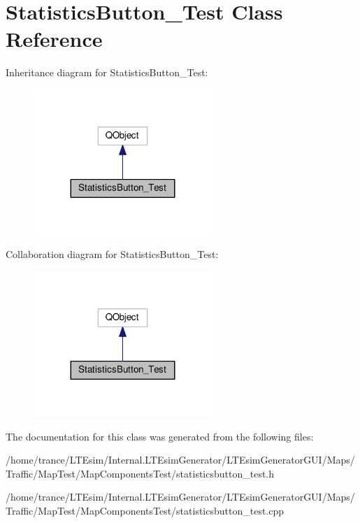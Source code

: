 \hypertarget{class_statistics_button___test}{}\section{Statistics\+Button\+\_\+\+Test Class Reference}
\label{class_statistics_button___test}


Inheritance diagram for Statistics\+Button\+\_\+\+Test\+:
\nopagebreak
\begin{figure}[H]
\begin{center}
\leavevmode
\includegraphics[width=191pt]{class_statistics_button___test__inherit__graph}
\end{center}
\end{figure}


Collaboration diagram for Statistics\+Button\+\_\+\+Test\+:
\nopagebreak
\begin{figure}[H]
\begin{center}
\leavevmode
\includegraphics[width=191pt]{class_statistics_button___test__coll__graph}
\end{center}
\end{figure}


The documentation for this class was generated from the following files\+:\begin{DoxyCompactItemize}
\item 
/home/trance/\+L\+T\+Esim/\+Internal.\+L\+T\+Esim\+Generator/\+L\+T\+Esim\+Generator\+G\+U\+I/\+Maps/\+Traffic/\+Map\+Test/\+Map\+Components\+Test/statisticsbutton\+\_\+test.\+h\item 
/home/trance/\+L\+T\+Esim/\+Internal.\+L\+T\+Esim\+Generator/\+L\+T\+Esim\+Generator\+G\+U\+I/\+Maps/\+Traffic/\+Map\+Test/\+Map\+Components\+Test/statisticsbutton\+\_\+test.\+cpp\end{DoxyCompactItemize}
